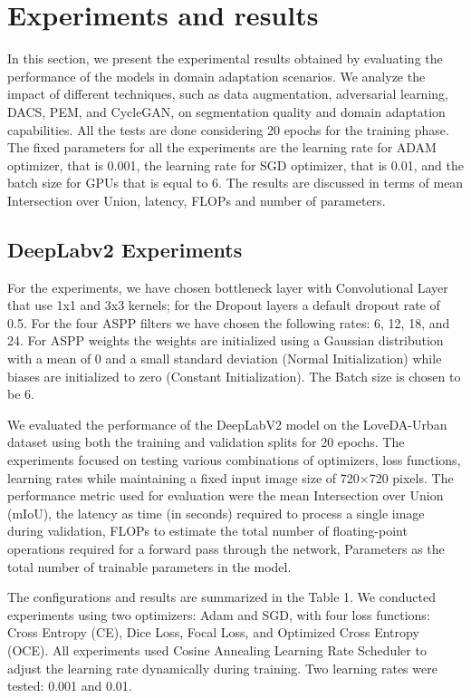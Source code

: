 \documentclass[10pt,twocolumn,letterpaper]{article}
\begin{document}
\noindent


\section{Experiments and results}
\label{sec:experiments}

In this section, we present the experimental results obtained by evaluating the performance of the models in domain adaptation scenarios. We analyze the impact of different techniques, such as data augmentation, adversarial learning, DACS, PEM, and CycleGAN, on segmentation quality and domain adaptation capabilities. All the tests are done considering 20 epochs for the training phase. The fixed parameters for all the experiments are the learning rate for ADAM optimizer, that is 0.001, the learning rate for SGD optimizer, that is 0.01, and the batch size for GPUs that is equal to 6.  The results are discussed in terms of mean Intersection over Union, latency, FLOPs and number of parameters. 

\subsection{DeepLabv2 Experiments}
For the experiments, we have chosen bottleneck layer with Convolutional Layer that use 1x1 and 3x3 kernels; for the Dropout layers a default dropout rate of 0.5. For the four ASPP filters we have chosen the following rates: 6, 12, 18, and 24. For ASPP weights the weights are initialized using a Gaussian distribution with a mean of 0 and a small standard deviation (Normal Initialization) while biases are initialized to zero (Constant Initialization). The Batch size is chosen to be 6.

We evaluated the performance of the DeepLabV2 model on the LoveDA-Urban dataset using both the training and validation splits for 20 epochs. The experiments focused on testing various combinations of optimizers, loss functions, learning rates while maintaining a fixed input image size of 720×720 pixels. The performance metric used for evaluation were the mean Intersection over Union (mIoU), the latency as time (in seconds) required to process a single image during validation, FLOPs to estimate the total number of floating-point operations required for a forward pass through the network, Parameters as the total number of trainable parameters in the model.

The configurations and results are summarized in the Table 1. We conducted experiments using two optimizers: Adam and SGD, with four loss functions: Cross Entropy (CE), Dice Loss, Focal Loss, and Optimized Cross Entropy (OCE). All experiments used Cosine Annealing Learning Rate Scheduler to adjust the learning rate dynamically during training. Two learning rates were tested: 0.001 and 0.01.
\end{document}
